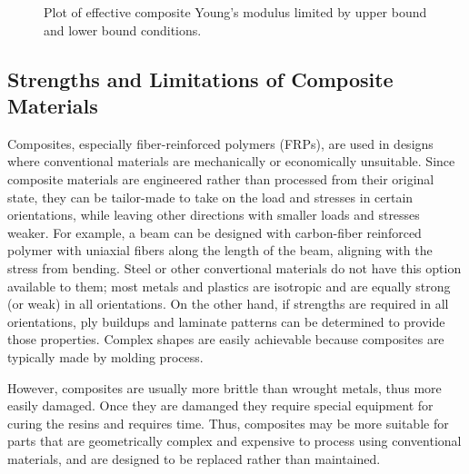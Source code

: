 \documentclass[
10pt,
a4paper,
openany,
svgnames,
]{book}
\begin{document}
\begin{figure}[H]
  \centering
  \caption[Effective composite Young's modulus range based on volume fraction]{Plot of effective composite Young's modulus limited by upper bound and lower bound conditions.}
  \label{fig: Composite modulus vs vol fraction}
\end{figure}

\subsection{Strengths and Limitations of Composite Materials}

Composites, especially fiber-reinforced polymers (FRPs), are used in designs where conventional materials are mechanically or economically unsuitable. Since composite materials are engineered rather than processed from their original state, they can be tailor-made to take on the load and stresses in certain orientations, while leaving other directions with smaller loads and stresses weaker. For example, a beam can be designed with carbon-fiber reinforced polymer with uniaxial fibers along the length of the beam, aligning with the stress from bending. Steel or other convertional materials do not have this option available to them; most metals and plastics are isotropic and are equally strong (or weak) in all orientations. On the other hand, if strengths are required in all orientations, ply buildups and laminate patterns can be determined to provide those properties. Complex shapes are easily achievable because composites are typically made by molding process.

However, composites are usually more brittle than wrought metals, thus more easily damaged. Once they are damanged they require special equipment for curing the resins and requires time. Thus, composites may be more suitable for parts that are geometrically complex and expensive to process using conventional materials, and are designed to be replaced rather than maintained.
\end{document}
